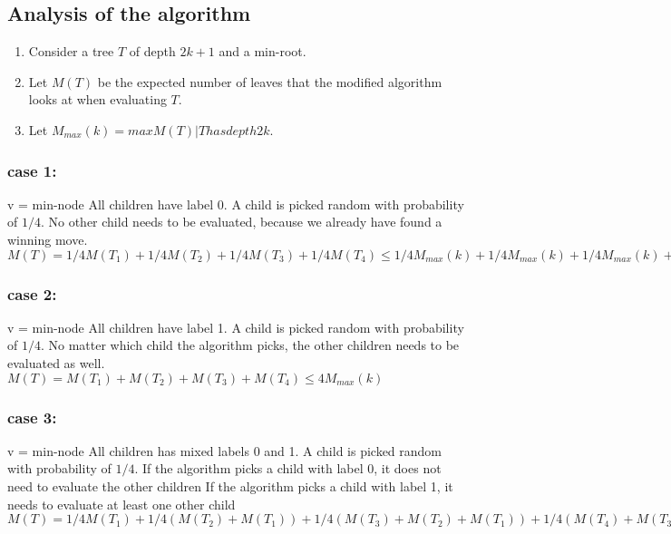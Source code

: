 \documentclass[11pt]{article}
\newcommand\tab[1][0.5cm]{\hspace*{#1}}
\begin{document}
\newpage
\subsection*{Analysis of the algorithm}

\begin{enumerate}
	\item Consider a tree $T$ of depth $2k + 1$ and a min-root.
	\item Let $M(T)$ be the expected number of leaves that the modified algorithm looks at when evaluating $T$.
	\item Let $M_{max}(k) = max{M(T) | T has depth 2k}$.
\end{enumerate}

\subsubsection*{case 1:}

\tab v = min-node \newline
\tab All children have label 0. \newline
\tab A child is picked random with probability of $1/4$. \newline
\tab No other child needs to be evaluated, because we already have found a winning move. \newline
\tab $M(T) = 1/4M(T_{1})+1/4M(T_{2})+1/4M(T_{3})+1/4M(T_{4}) \leq 1/4M_{max}(k)+1/4M_{max}(k)+1/4M_{max}(k)+1/4M_{max}(k)=M_{max}(k)$

\subsubsection*{case 2:}

\tab v = min-node \newline
\tab All children have label 1. \newline
\tab A child is picked random with probability of $1/4$. \newline
\tab No matter which child the algorithm picks, the other children needs to be evaluated as well. \newline
\tab $M(T) = M(T_{1})+M(T_{2})+M(T_{3})+M(T_{4}) \leq 4 M_{max}(k)$

\subsubsection*{case 3:}

\tab v = min-node \newline
\tab All children has mixed labels 0 and 1. \newline
\tab A child is picked random with probability of $1/4$. \newline
\tab If the algorithm picks a child with label 0, it does not need to evaluate the other children \newline
\tab If the algorithm picks a child with label 1, it needs to evaluate at least one other child \newline
\tab $M(T) = 1/4M(T_{1})+1/4(M(T_{2})+M(T_{1})) + 1/4(M(T_{3})+M(T_{2})+M(T_{1})) + 1/4(M(T_{4})+M(T_{3})+M(T_{2})+M(T_{1})) \leq 2.5 M_{max}(k)$ \newline
\end{document}
